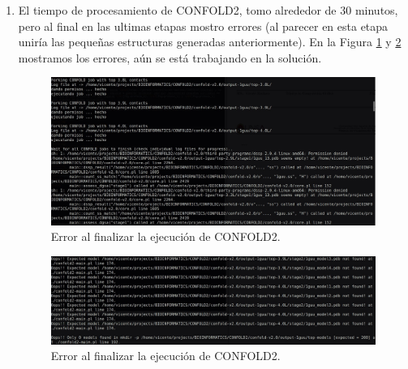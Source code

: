 \documentclass{article}
\begin{document}
\begin{enumerate}
	
		
		\item El tiempo de procesamiento de CONFOLD2, tomo alrededor de 30 minutos, pero al final en las ultimas etapas mostro errores (al parecer en esta etapa uniría las pequeñas estructuras generadas anteriormente). En la Figura \ref{fig:confold_error_1} y \ref{fig:confold_error_2} mostramos los errores, aún se está trabajando en la solución.
		
		\begin{figure}[H]
			\centering
			\includegraphics[width=\textwidth]{img/papers/confold_error_1}
			\caption{Error al finalizar la ejecución de CONFOLD2.}
			\label{fig:confold_error_1}
		\end{figure}
		
		\begin{figure}[H]
			\centering
			\includegraphics[width=\textwidth]{img/papers/confold_error_2}
			\caption{Error al finalizar la ejecución de CONFOLD2.}
			\label{fig:confold_error_2}
		\end{figure}
		
	\end{enumerate}
	

	



	
	
	\clearpage
	
	
	
	
	
	
	
\end{document}
